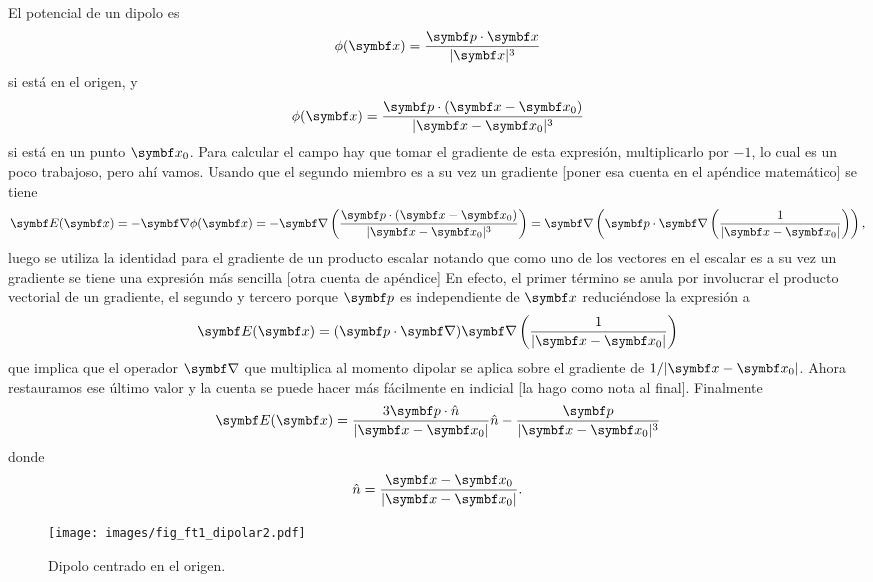\documentclass[10pt,oneside]{CBFT_book}
\begin{document}
El potencial de un dipolo es
\[
	\phi(\vb{x}) = \frac{ \vb{p}\cdot\vb{x} }{|\vb{x}|^3} 
\]
si está en el origen, y
\[
	\phi(\vb{x}) = \frac{ \vb{p}\cdot(\vb{x}-\vb{x}_0) }{|\vb{x} - \vb{x}_0|^3} 
\]
si está en un punto $\vb{x}_0$. Para calcular el campo hay que tomar el gradiente de esta expresión,
multiplicarlo por $-1$, lo cual es un poco trabajoso, pero ahí vamos.
Usando que el segundo miembro es a su vez un gradiente [poner esa cuenta en el apéndice matemático]
se tiene 
\[
	\vb{E}(\vb{x}) = -\Nabla \phi(\vbx) = 
	-\Nabla \left( \frac{ \vb{p}\cdot(\vb{x}-\vb{x}_0) }{|\vb{x} - \vb{x}_0|^3} \right) =
	\Nabla \left( \vb{p} \cdot \Nabla\left( \frac{ 1 }{|\vb{x} - \vb{x}_0|} \right) \right),
\]
luego se utiliza la identidad para el gradiente de un producto escalar notando que como uno de
los vectores en el escalar es a su vez un gradiente se tiene una expresión más sencilla 
[otra cuenta de apéndice]
En efecto, el primer término se anula por involucrar el producto vectorial de un gradiente, el
segundo y tercero porque $\vb{p}$ es independiente de $\vbx$ reduciéndose la expresión a
\[
	\vb{E}(\vb{x}) = (\vb{p}\cdot\Nabla) \Nabla\left( \frac{ 1 }{|\vb{x} - \vb{x}_0|} \right)
\]
que implica que el operador $\Nabla$ que multiplica al momento dipolar se aplica sobre el gradiente
de $1/|\vb{x} - \vb{x}_0|$. Ahora restauramos ese último valor y la cuenta se 
puede hacer más fácilmente en indicial [la hago como nota al final]. 
Finalmente
\[
	\vb{E}(\vb{x}) = \frac{3 \vb{p}\cdot\hat{n} }{|\vb{x} - \vb{x}_0|}  \hat{n} - 
		\frac{ \vb{p} }{|\vb{x} - \vb{x}_0|^3}	
\]
donde 
\[
	\hat{n} = \frac{\vb{x}-\vb{x}_0}{|\vb{x}-\vb{x}_0|}.
\]

\begin{figure}[htb]
	\begin{center}
	\texttt{[image: images/fig\_ft1\_dipolar2.pdf]}	 
	\end{center}
	\caption{Dipolo centrado en el origen.}
\end{figure}
\end{document}
